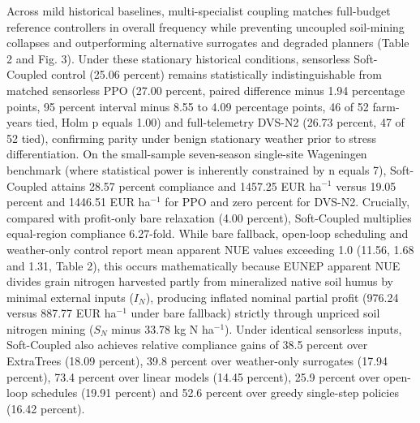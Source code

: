 \documentclass[11pt,a4paper]{article}
\begin{document}
Across mild historical baselines, multi-specialist coupling matches full-budget reference controllers in overall frequency while preventing uncoupled soil-mining collapses and outperforming alternative surrogates and degraded planners (Table 2 and Fig. 3). Under these stationary historical conditions, sensorless Soft-Coupled control (25.06 percent) remains statistically indistinguishable from matched sensorless PPO (27.00 percent, paired difference minus 1.94 percentage points, 95 percent interval minus 8.55 to 4.09 percentage points, 46 of 52 farm-years tied, Holm p equals 1.00) and full-telemetry DVS-N2 (26.73 percent, 47 of 52 tied), confirming parity under benign stationary weather prior to stress differentiation. On the small-sample seven-season single-site Wageningen benchmark (where statistical power is inherently constrained by n equals 7), Soft-Coupled attains 28.57 percent compliance and 1457.25 EUR ha$^{-1}$ versus 19.05 percent and 1446.51 EUR ha$^{-1}$ for PPO and zero percent for DVS-N2. Crucially, compared with profit-only bare relaxation (4.00 percent), Soft-Coupled multiplies equal-region compliance 6.27-fold. While bare fallback, open-loop scheduling and weather-only control report mean apparent NUE values exceeding 1.0 (11.56, 1.68 and 1.31, Table 2), this occurs mathematically because EUNEP apparent NUE divides grain nitrogen harvested partly from mineralized native soil humus by minimal external inputs ($I_N$), producing inflated nominal partial profit (976.24 versus 887.77 EUR ha$^{-1}$ under bare fallback) strictly through unpriced soil nitrogen mining ($S_N$ minus 33.78 kg N ha$^{-1}$). Under identical sensorless inputs, Soft-Coupled also achieves relative compliance gains of 38.5 percent over ExtraTrees (18.09 percent), 39.8 percent over weather-only surrogates (17.94 percent), 73.4 percent over linear models (14.45 percent), 25.9 percent over open-loop schedules (19.91 percent) and 52.6 percent over greedy single-step policies (16.42 percent).
\end{document}
